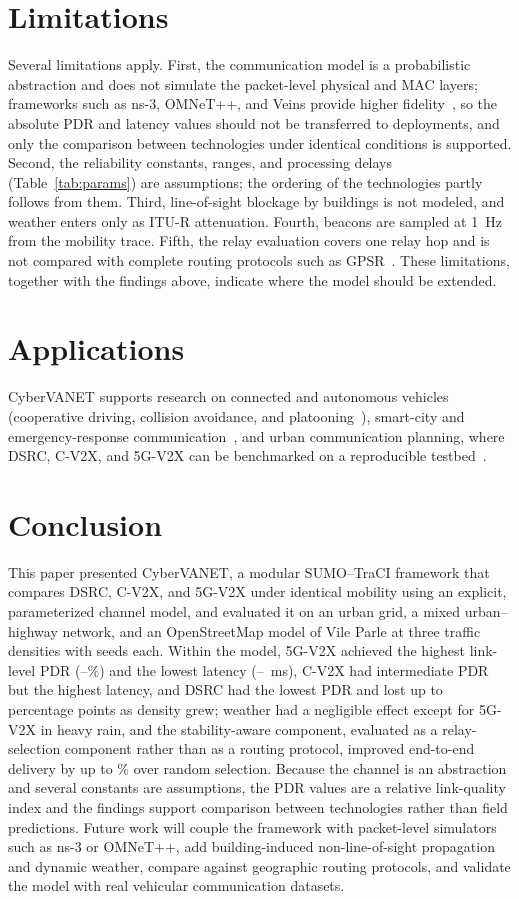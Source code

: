 \documentclass[conference]{IEEEtran}
\begin{document}
\section{Limitations}
\label{sec:limits}
Several limitations apply. First, the communication model is a probabilistic abstraction and does not simulate the packet-level physical and MAC layers; frameworks such as ns-3, OMNeT++, and Veins provide higher fidelity~\cite{loor2024,morales2024,sommer2011}, so the absolute PDR and latency values should not be transferred to deployments, and only the comparison between technologies under identical conditions is supported. Second, the reliability constants, ranges, and processing delays (Table~\ref{tab:params}) are assumptions; the ordering of the technologies partly follows from them. Third, line-of-sight blockage by buildings is not modeled, and weather enters only as ITU-R attenuation. Fourth, beacons are sampled at 1~Hz from the mobility trace. Fifth, the relay evaluation covers one relay hop and is not compared with complete routing protocols such as GPSR~\cite{karp2000}. These limitations, together with the findings above, indicate where the model should be extended.

\section{Applications}
CyberVANET supports research on connected and autonomous vehicles (cooperative driving, collision avoidance, and platooning~\cite{pawar2024}), smart-city and emergency-response communication~\cite{souri2024,pawar2024}, and urban communication planning, where DSRC, C-V2X, and 5G-V2X can be benchmarked on a reproducible testbed~\cite{baccari2025,chen2024}.

\section{Conclusion}
This paper presented CyberVANET, a modular SUMO--TraCI framework that compares DSRC, C-V2X, and 5G-V2X under identical mobility using an explicit, parameterized channel model, and evaluated it on an urban grid, a mixed urban--highway network, and an OpenStreetMap model of Vile Parle at three traffic densities with \nSeeds{} seeds each. Within the model, 5G-V2X achieved the highest link-level PDR (\pdrMinGv--\pdrMaxGv\%) and the lowest latency (\latMinGv--\latMaxGv~ms), C-V2X had intermediate PDR but the highest latency, and DSRC had the lowest PDR and lost up to \dropMDsrc{} percentage points as density grew; weather had a negligible effect except for 5G-V2X in heavy rain, and the stability-aware component, evaluated as a relay-selection component rather than as a routing protocol, improved end-to-end delivery by up to \gainMaxGv\% over random selection. Because the channel is an abstraction and several constants are assumptions, the PDR values are a relative link-quality index and the findings support comparison between technologies rather than field predictions. Future work will couple the framework with packet-level simulators such as ns-3 or OMNeT++, add building-induced non-line-of-sight propagation and dynamic weather, compare against geographic routing protocols, and validate the model with real vehicular communication datasets.
\end{document}
